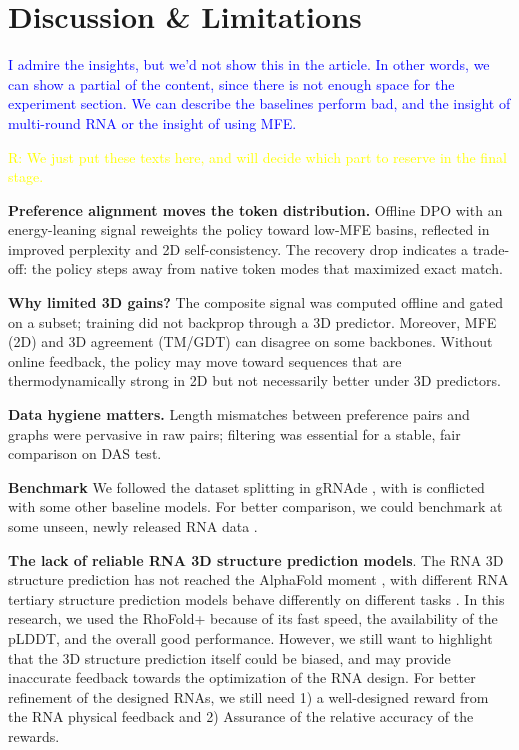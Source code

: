 \section{Discussion \& Limitations}

\textcolor{blue}{I admire the insights, but we'd not show this in the article. In other words, we can show a partial of the content, since there is not enough space for the experiment section. We can describe the baselines perform bad, and the insight of multi-round RNA or the insight of using MFE.}

\textcolor{yellow}{R: We just put these texts here, and will decide which part to reserve in the final stage.}

\textbf{Preference alignment moves the token distribution.} Offline DPO with an energy-leaning signal reweights the policy toward low-MFE basins, reflected in improved perplexity and 2D self-consistency. The recovery drop indicates a trade-off: the policy steps away from native token modes that maximized exact match.

\textbf{Why limited 3D gains?} The composite signal was computed offline and gated on a subset; training did not backprop through a 3D predictor. Moreover, MFE (2D) and 3D agreement (TM/GDT) can disagree on some backbones. Without online feedback, the policy may move toward sequences that are thermodynamically strong in 2D but not necessarily better under 3D predictors.

\textbf{Data hygiene matters.} Length mismatches between preference pairs and graphs were pervasive in raw pairs; filtering was essential for a stable, fair comparison on DAS test.

\textbf{Benchmark} We followed the dataset splitting in gRNAde \citep{joshi2025grnade}, with is conflicted with some other baseline models. For better comparison, we could benchmark at some unseen, newly released RNA data \citep{Martin2024review}. 

\textbf{The lack of reliable RNA 3D structure prediction models}. The RNA 3D structure prediction has not reached the AlphaFold moment \citep{schneider2023rnaalphafoldmoment}, with different RNA tertiary structure prediction models behave differently on different tasks \citep{Martin2024review}. In this research, we used the RhoFold+ \citep{shen2024accurate} because of its fast speed, the availability of the pLDDT, and the overall good performance. However, we still want to highlight that the 3D structure prediction itself could be biased, and may provide inaccurate feedback towards the optimization of the RNA design. For better refinement of the designed RNAs, we still need 1) a well-designed reward from the RNA physical feedback and 2) Assurance of the relative accuracy of the rewards. 




